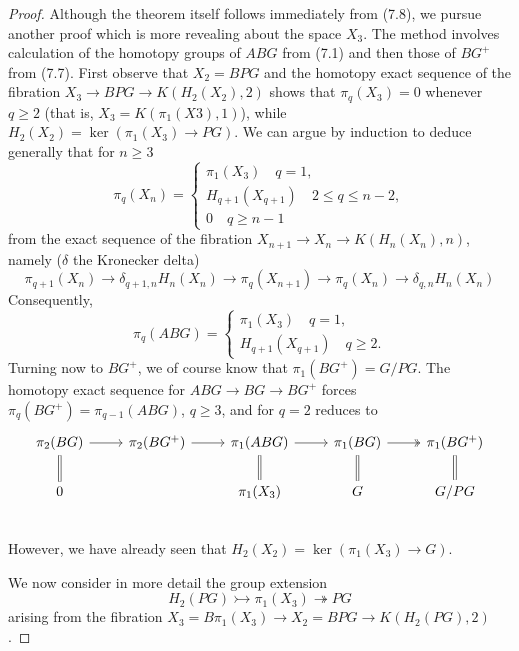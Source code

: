 \begin{proof}
Although the theorem itself follows immediately from (7.8), we pursue another proof which is more revealing about the space $X_3$. The method involves calculation of the homotopy groups of $ABG$ from (7.1) and then those of $ BG^+$ from (7.7). First observe that $X_2 = BPG$ and the homotopy exact sequence of the fibration $X_3 \longrightarrow BPG \longrightarrow K(H_2(X_2),2)$ shows that $\pi_q(X_3) = 0$ whenever $q \geqslant 2$ (that is, $X_3 = K(\pi_1 (X3), 1)$), while $H_2(X_2) = \ker (\pi_1(X_3)\longrightarrow PG)$. We can argue by induction to deduce generally that for $n \geqslant 3$
\begin{equation*}
\pi_q(X_n)=
  \begin{cases}
\pi_1(X_3) \quad q=1, \\
H_{q+1}(X_{q+1}) \quad 2\leqslant q\leqslant n-2,\\
0 \quad q\geqslant n-1
\end{cases}
\end{equation*}
from the exact sequence of the fibration $X_{n+1}\longrightarrow X_n \longrightarrow K(H_n(X_n), n)$, namely ($\delta$ the Kronecker delta)
\[\pi_{q+1}(X_{n})   \longrightarrow   \delta_{q+1,n}H_n(X_n)   \longrightarrow  \pi_{q}(X_{n+1})  \longrightarrow   \pi_{q}(X_{n})  \longrightarrow  \delta_{q,n}H_n(X_n)  \]
Consequently,
\begin{equation*}
\pi_q(ABG)=
  \begin{cases}
\pi_1(X_3) \quad q=1, \\
H_{q+1}(X_{q+1}) \quad q\geqslant 2.
\end{cases}
\end{equation*}
Turning now to $BG^+$, we of course know that $\pi_1(BG^+) = G/PG$. The homotopy exact sequence for $ABG \longrightarrow BG \longrightarrow BG^+$ forces $\pi_q(BG^+)=\pi_{q-1}(ABG)$, $q \geqslant 3$, and for $q= 2$ reduces to
\[
\begin{tikzcd}
  \pi_2(BG) \arrow[r] \arrow[equal]{d} &  \pi_2(BG^+) \arrow[r] &   \pi_1(ABG)  \arrow[r]\arrow[equal]{d}  & \pi_1(BG)\arrow[r,two heads] \arrow[equal]{d} &  \pi_1(BG^+) \arrow[equal]{d} \\
  0 & & \pi_1(X_3) & G & G/PG \\
\end{tikzcd}
\]
However, we have already seen that $H_2(X_2) = \ker (\pi_1(X_3) \longrightarrow G)$.

We now consider in more detail the group extension
\[H_2(PG)\rightarrowtail \pi_1(X_3) \twoheadrightarrow PG\]
arising from the fibration $X_3 = B\pi_1(X_3) \longrightarrow X_2 = BPG \longrightarrow  K(H_2(PG), 2)$.
\end{proof}
